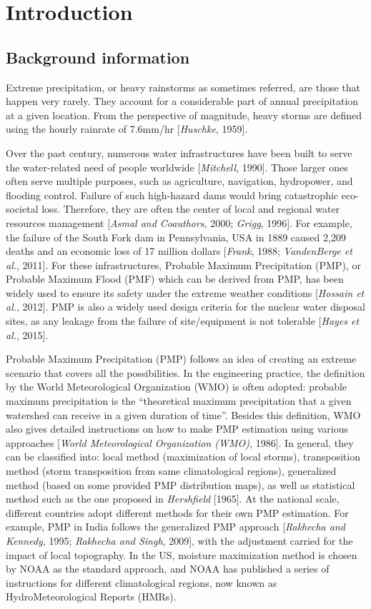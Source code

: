 \chapter {Introduction}
\label{ch:intro}

\section {Background information}

Extreme precipitation, or heavy rainstorms as sometimes referred, are those that happen very rarely. They account for a considerable part of annual precipitation at a given location. From the perspective of magnitude, heavy storms are defined using the hourly rainrate of 7.6mm/hr [\textit{Huschke}, 1959].

Over the past century, numerous water infrastructures have been built to serve the water-related need of people worldwide [\textit{Mitchell}, 1990]. Those larger ones often serve multiple purposes, such as agriculture, navigation, hydropower, and flooding control. Failure of such high-hazard dams would bring catastrophic eco-societal loss. Therefore, they are often the center of local and regional water resources management [\textit{Asmal and Coauthors}, 2000; \textit{Grigg}, 1996]. For example, the failure of the South Fork dam in Pennsylvania, USA in 1889 caused 2,209 deaths and an economic loss of 17 million dollars [\textit{Frank}, 1988; \textit{VandenBerge et al.}, 2011].  For these infrastructures, Probable Maximum Precipitation (PMP), or Probable Maximum Flood (PMF) which can be derived from PMP,  has been widely used to ensure its safety under the extreme weather conditions [\textit{Hossain et al.}, 2012]. PMP is also a widely used design criteria for the nuclear water disposal sites, as any leakage from the failure of site/equipment is not tolerable [\textit{Hayes et al.}, 2015].

Probable Maximum Precipitation (PMP) follows an idea of creating an extreme scenario that covers all the possibilities. In the engineering practice, the definition by the World Meteorological Organization (WMO) is often adopted: probable maximum precipitation is the ``theoretical maximum precipitation that a given watershed can receive in a given duration of time''. Besides this definition, WMO also gives detailed instructions on how to make PMP estimation using various approaches [\textit{World Meteorological Organization (WMO)}, 1986]. In general, they can be classified into: local method (maximization of local storms), transposition method (storm transposition from same climatological regions), generalized method (based on some provided PMP distribution maps), as well as statistical method such as the one proposed in \textit{Hershfield} [1965]. At the national scale, different countries adopt different methods for their own PMP estimation. For example, PMP in India follows the generalized PMP approach [\textit{Rakhecha and Kennedy}, 1995; \textit{Rakhecha and Singh}, 2009], with the adjustment carried for the impact of local topography. In the US, moisture maximization method is chosen by NOAA as the standard approach, and NOAA has published a series of instructions for different climatological regions, now known as HydroMeteorological Reports (HMRs).

